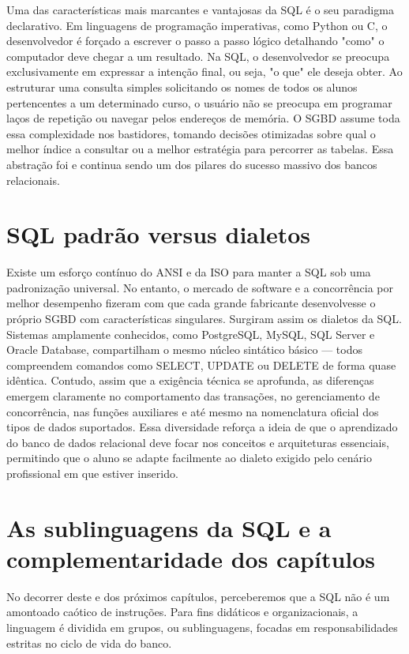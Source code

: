 Uma das características mais marcantes e vantajosas da SQL é o seu paradigma declarativo. Em linguagens de programação imperativas, como Python ou C, o desenvolvedor é forçado a escrever o passo a passo lógico detalhando "como" o computador deve chegar a um resultado. Na SQL, o desenvolvedor se preocupa exclusivamente em expressar a intenção final, ou seja, "o que" ele deseja obter. Ao estruturar uma consulta simples solicitando os nomes de todos os alunos pertencentes a um determinado curso, o usuário não se preocupa em programar laços de repetição ou navegar pelos endereços de memória. O SGBD assume toda essa complexidade nos bastidores, tomando decisões otimizadas sobre qual o melhor índice a consultar ou a melhor estratégia para percorrer as tabelas. Essa abstração foi e continua sendo um dos pilares do sucesso massivo dos bancos relacionais.

\section{SQL padrão versus dialetos}

Existe um esforço contínuo do ANSI e da ISO para manter a SQL sob uma padronização universal. No entanto, o mercado de software e a concorrência por melhor desempenho fizeram com que cada grande fabricante desenvolvesse o próprio SGBD com características singulares. Surgiram assim os dialetos da SQL. Sistemas amplamente conhecidos, como PostgreSQL, MySQL, SQL Server e Oracle Database, compartilham o mesmo núcleo sintático básico — todos compreendem comandos como SELECT, UPDATE ou DELETE de forma quase idêntica. Contudo, assim que a exigência técnica se aprofunda, as diferenças emergem claramente no comportamento das transações, no gerenciamento de concorrência, nas funções auxiliares e até mesmo na nomenclatura oficial dos tipos de dados suportados. Essa diversidade reforça a ideia de que o aprendizado do banco de dados relacional deve focar nos conceitos e arquiteturas essenciais, permitindo que o aluno se adapte facilmente ao dialeto exigido pelo cenário profissional em que estiver inserido.

\section{As sublinguagens da SQL e a complementaridade dos capítulos}

No decorrer deste e dos próximos capítulos, perceberemos que a SQL não é um amontoado caótico de instruções. Para fins didáticos e organizacionais, a linguagem é dividida em grupos, ou sublinguagens, focadas em responsabilidades estritas no ciclo de vida do banco.

